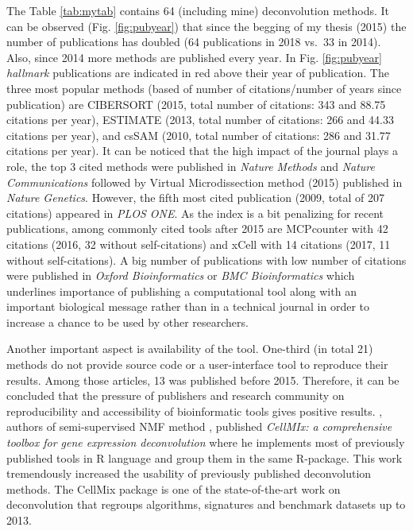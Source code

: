 \documentclass[12pt,]{book}
\theoremstyle{definition}
\theoremstyle{definition}
\theoremstyle{definition}
\theoremstyle{remark}
\begin{document}
The Table \ref{tab:mytab} contains 64 (including mine) deconvolution
methods. It can be observed (Fig. \ref{fig:pubyear}) that since the
begging of my thesis (2015) the number of publications has doubled (64
publications in 2018 vs.~33 in 2014). Also, since 2014 more methods are
published every year. In Fig. \ref{fig:pubyear} \emph{hallmark}
publications are indicated in red above their year of publication. The
three most popular methods (based of number of citations/number of years
since publication) are CIBERSORT \citep{Newman2015} (2015, total number
of citations: 343 and 88.75 citations per year), ESTIMATE
\citep{Yoshihara2013} (2013, total number of citations: 266 and 44.33
citations per year), and csSAM \citep{ShenOrr2010} (2010, total number
of citations: 286 and 31.77 citations per year). It can be noticed that
the high impact of the journal plays a role, the top 3 cited methods
were published in \emph{Nature Methods} and \emph{Nature Communications}
followed by Virtual Microdissection method \citep{Moffitt2015} (2015)
published in \emph{Nature Genetics}. However, the fifth most cited
publication \citet{Abbas2009} (2009, total of 207 citations) appeared in
\emph{PLOS ONE}. As the index is a bit penalizing for recent
publications, among commonly cited tools after 2015 are MCPcounter with
42 citations (2016, 32 without self-citations) and xCell with 14
citations (2017, 11 without self-citations). A big number of
publications with low number of citations were published in \emph{Oxford
Bioinformatics} or \emph{BMC Bioinformatics} which underlines importance
of publishing a computational tool along with an important biological
message rather than in a technical journal in order to increase a chance
to be used by other researchers.

Another important aspect is availability of the tool. One-third (in
total 21) methods do not provide source code or a user-interface tool to
reproduce their results. Among those articles, 13 was published before
2015. Therefore, it can be concluded that the pressure of publishers and
research community on reproducibility and accessibility of bioinformatic
tools gives positive results. \citet{Shen-Orr2013}, authors of
semi-supervised NMF method \citep{Gaujoux2012}, published \emph{CellMIx:
a comprehensive toolbox for gene expression deconvolution} where he
implements most of previously published tools in R language and group
them in the same R-package. This work tremendously increased the
usability of previously published deconvolution methods. The CellMix
package is one of the state-of-the-art work on deconvolution that
regroups algorithms, signatures and benchmark datasets up to 2013.
\end{document}
